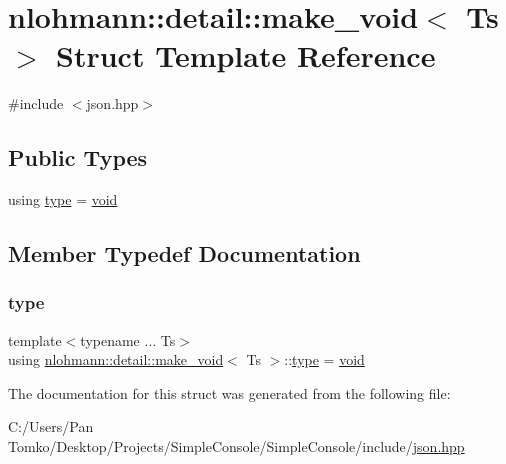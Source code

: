 \hypertarget{structnlohmann_1_1detail_1_1make__void}{}\section{nlohmann\+::detail\+::make\+\_\+void$<$ Ts $>$ Struct Template Reference}
\label{structnlohmann_1_1detail_1_1make__void}


{\ttfamily \#include $<$json.\+hpp$>$}

\subsection*{Public Types}
\begin{DoxyCompactItemize}
\item 
using \mbox{\hyperlink{structnlohmann_1_1detail_1_1make__void_a8961e24ae3b2cb65ec47d1ce805d94e4}{type}} = \mbox{\hyperlink{namespacenlohmann_1_1detail_a59fca69799f6b9e366710cb9043aa77d}{void}}
\end{DoxyCompactItemize}


\subsection{Member Typedef Documentation}
\mbox{\label{structnlohmann_1_1detail_1_1make__void_a8961e24ae3b2cb65ec47d1ce805d94e4}} 
\subsubsection{\texorpdfstring{type}{type}}
{\footnotesize\ttfamily template$<$typename ... Ts$>$ \\
using \mbox{\hyperlink{structnlohmann_1_1detail_1_1make__void}{nlohmann\+::detail\+::make\+\_\+void}}$<$ Ts $>$\+::\mbox{\hyperlink{structnlohmann_1_1detail_1_1make__void_a8961e24ae3b2cb65ec47d1ce805d94e4}{type}} =  \mbox{\hyperlink{namespacenlohmann_1_1detail_a59fca69799f6b9e366710cb9043aa77d}{void}}}



The documentation for this struct was generated from the following file\+:\begin{DoxyCompactItemize}
\item 
C\+:/\+Users/\+Pan Tomko/\+Desktop/\+Projects/\+Simple\+Console/\+Simple\+Console/include/\mbox{\hyperlink{json_8hpp}{json.\+hpp}}\end{DoxyCompactItemize}
